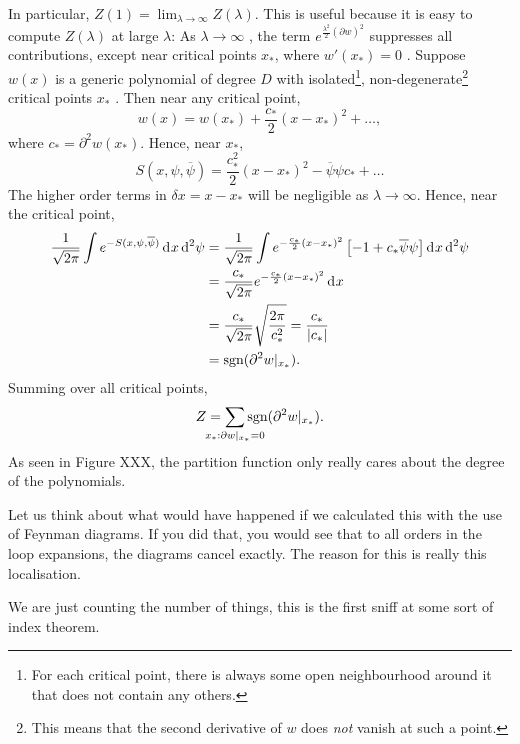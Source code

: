 In particular, $ Z(1) = \lim_{\lambda \to \infty}  Z(\lambda) $. This is useful because it is easy to compute $Z(\lambda)$  at large $\lambda$: As $\lambda \to \infty$ , the term $e^{\frac{\lambda^2}{2} (\partial w)^2}$  suppresses all contributions, except near critical points $x_*$, where  $w'(x_*) = 0$ .
Suppose $w(x)$  is a generic polynomial of degree $D$ with isolated\footnote{For each critical point, there is always some open neighbourhood around it that does not contain any others.}, non-degenerate\footnote{This means that the second derivative of $w$ does \emph{not} vanish at such a point.} critical points  $x_*$ .
Then near any critical point, 
\begin{equation}
  w(x) = w(x_*) + \frac{c_*}{2} (x-x_*)^2 + \dots,
\end{equation} 
where $c_* = \partial^2 w(x_*)$.
Hence, near $x_*$,
\begin{equation}
  S(x, \psi, \overline{\psi}) = \frac{c_*^2}{2} (x - x_*)^2 - \overline{\psi}\psi c_* + \dots
\end{equation}
The higher order terms in $\delta x = x - x_*$ will be negligible as $\lambda \to \infty$.
Hence, near the critical point,
\begin{align}
  \frac{1}{\sqrt{2\pi}} \int e^{-S(x, \psi, \overline{\psi})} \dd[]{x} \dd[2]{\psi} &= \frac{1}{\sqrt{2\pi}} \int e^{-\frac{c_*}{2} (x  -x_*)^2} \left[ -1 + c_* \overline{\psi} \psi \right] \dd[]{x} \dd[2]{\psi} \\
										    &= \frac{c_*}{\sqrt{ 2 \pi}} e^{-\frac{c_*}{2} (x - x_*)^2} \dd[]{x} \\
										    &= \frac{c_*}{\sqrt{ 2 \pi}} \sqrt{\frac{2 \pi}{c_*^2}} = \frac{c_*}{\abs{c_*}} \\
										    &= \text{sgn}(\partial^2 w \rvert_{x_*}).
\end{align}
Summing over all critical points, 
\begin{equation}
  Z = \sum_{\mathclap{x_*: \partial w\rvert_{x_*} = 0}} \text{sgn}(\partial^2 w\rvert_{x_*}).
\end{equation}
As seen in Figure XXX, the partition function only really cares about the degree of the polynomials.

Let us think about what would have happened if we calculated this with the use of Feynman diagrams.
If you did that, you would see that to all orders in the loop expansions, the diagrams cancel exactly.
The reason for this is really this localisation.

We are just counting the number of things, this is the first sniff at some sort of index theorem.
